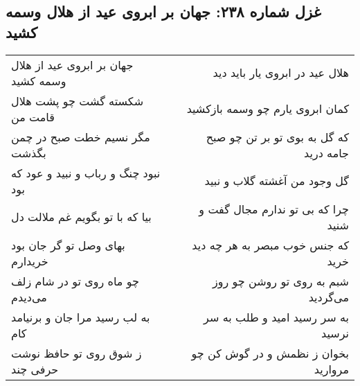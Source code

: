 \begin{center}
\section*{غزل شماره ۲۳۸: جهان بر ابروی عید از هلال وسمه کشید}
\label{sec:sh238}
\begin{longtable}{l p{0.5cm} r}
جهان بر ابروی عید از هلال وسمه کشید
&&
هلال عید در ابروی یار باید دید
\\
شکسته گشت چو پشت هلال قامت من
&&
کمان ابروی یارم چو وسمه بازکشید
\\
مگر نسیم خطت صبح در چمن بگذشت
&&
که گل به بوی تو بر تن چو صبح جامه درید
\\
نبود چنگ و رباب و نبید و عود که بود
&&
گل وجود من آغشته گلاب و نبید
\\
بیا که با تو بگویم غم ملالت دل
&&
چرا که بی تو ندارم مجال گفت و شنید
\\
بهای وصل تو گر جان بود خریدارم
&&
که جنس خوب مبصر به هر چه دید خرید
\\
چو ماه روی تو در شام زلف می‌دیدم
&&
شبم به روی تو روشن چو روز می‌گردید
\\
به لب رسید مرا جان و برنیامد کام
&&
به سر رسید امید و طلب به سر نرسید
\\
ز شوق روی تو حافظ نوشت حرفی چند
&&
بخوان ز نظمش و در گوش کن چو مروارید
\\
\end{longtable}
\end{center}
